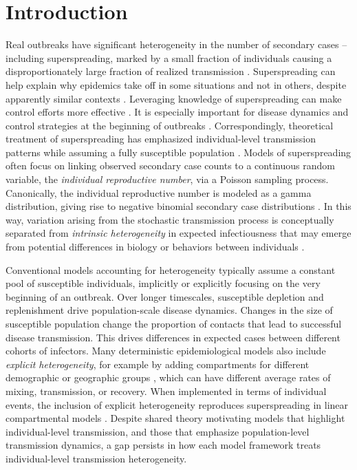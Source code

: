 \section{Introduction}

Real outbreaks have significant heterogeneity in the number of secondary cases -- including superspreading, marked by a small fraction of individuals causing a disproportionately large fraction of realized transmission \cite{lloydsmith2005superspreading, woolhouse1997heterogeneities}. %
Superspreading can help explain why epidemics take off in some situations and not in others, despite apparently similar contexts \cite{lemieux2021phylogenetic, endo2020estimating}. Leveraging knowledge of superspreading can make control efforts more effective \cite{garske2008effect, nielsen2023counterintuitive, sneppen2021overdispersion}. It is especially important for disease dynamics and control strategies at the beginning of outbreaks  \cite{goyal2022multiscale}. Correspondingly, theoretical treatment of superspreading has emphasized individual-level transmission patterns while assuming a fully susceptible population \cite{lloydsmith2005superspreading,james2007eventbased}. Models of superspreading often focus on linking observed secondary case counts to a continuous random variable, the \emph{individual reproductive number}, via a Poisson sampling process. Canonically, the individual reproductive number is modeled as a gamma distribution, giving rise to negative binomial secondary case distributions \cite{lloydsmith2005superspreading}. In this way, variation arising from the stochastic transmission process is conceptually separated from \textit{intrinsic heterogeneity} in expected infectiousness that may emerge from potential differences in biology or behaviors between individuals \cite{chen2021heterogeneity, althouse2020superspreading,hamner2020high}.

Conventional models accounting for heterogeneity typically assume a constant pool of susceptible individuals, implicitly or explicitly focusing on the very beginning of an outbreak. Over longer timescales, susceptible depletion and replenishment drive population-scale disease dynamics. Changes in the size of susceptible population change the proportion of contacts that lead to successful disease transmission. This drives differences in expected cases  between different cohorts of infectors. Many deterministic epidemiological models also include \emph{explicit heterogeneity}, for example by adding compartments for different demographic or geographic groups \cite{schenzle1984agestructured}, which can have different average rates of mixing, transmission, or recovery. When implemented in terms of individual events, the inclusion of explicit heterogeneity reproduces superspreading in linear compartmental models \cite{meehan2023replicating}. Despite shared theory motivating models that highlight individual-level transmission, and those that emphasize population-level transmission dynamics, a gap persists in how each model framework treats individual-level transmission heterogeneity. 

